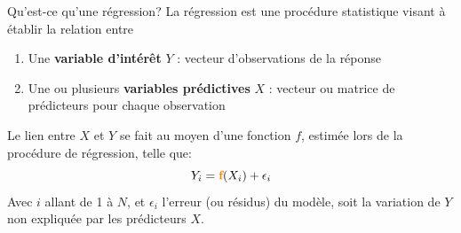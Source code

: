	
	\begin{frame}{Qu'est-ce qu'une régression?}
	La régression est une procédure statistique visant à établir la relation entre
	
		\begin{enumerate}
		    \item Une \textbf{variable d'intérêt} $Y$ : vecteur d'observations de la réponse
		    
		    \item Une ou plusieurs \textbf{variables prédictives} $X$ :  vecteur ou matrice de prédicteurs pour chaque observation
		\end{enumerate}
		Le lien entre $X$ et $Y$ se fait au moyen d'une fonction $f$, estimée lors de la procédure de régression, telle que:
		\Large
		\begin{equation*}
		    Y_i = \textcolor{orange}{\textbf{f}}(X_i) + \epsilon_i
		\end{equation*}
		\small
		Avec $i$ allant de 1 à $N$, et $\epsilon_i$ l'erreur (ou résidus) du modèle, soit la variation de $Y$ non expliquée par les prédicteurs $X$.

	\end{frame}
	
